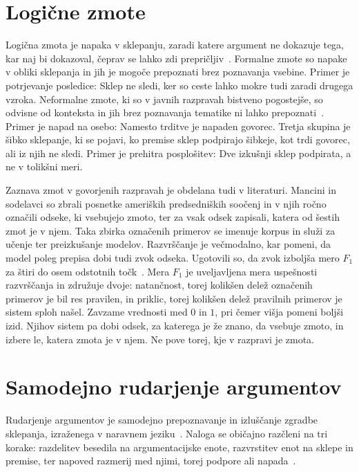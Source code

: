 \documentclass[a4paper, 12pt]{book}
\begin{document}
\section{Logične zmote}
\label{sec:zmote}
Logična zmota je napaka v sklepanju, zaradi katere argument ne dokazuje tega, kar naj bi dokazoval, čeprav se lahko zdi prepričljiv~\cite{copi2014}. Formalne zmote so napake v obliki sklepanja in jih je mogoče prepoznati brez poznavanja vsebine. Primer je potrjevanje posledice:  Sklep ne sledi, ker so ceste lahko mokre tudi zaradi drugega vzroka. Neformalne zmote, ki so v javnih razpravah bistveno pogostejše, so odvisne od konteksta in jih brez poznavanja tematike ni lahko prepoznati~\cite{walton2008}. Primer je napad na osebo:  Namesto trditve je napaden govorec. Tretja skupina je šibko sklepanje, ki se pojavi, ko premise sklep podpirajo šibkeje, kot trdi govorec, ali iz njih ne sledi. Primer je prehitra posplošitev:  Dve izkušnji sklep podpirata, a ne v tolikšni meri.

Zaznava zmot v govorjenih razpravah je obdelana tudi v literaturi. Mancini in sodelavci so zbrali posnetke ameriških predsedniških soočenj in v njih ročno označili odseke, ki vsebujejo zmoto, ter za vsak odsek zapisali, katera od šestih zmot je v njem. Taka zbirka označenih primerov se imenuje korpus in služi za učenje ter preizkušanje modelov. Razvrščanje je večmodalno, kar pomeni, da model poleg prepisa dobi tudi zvok odseka. Ugotovili so, da zvok izboljša mero $F_1$ za štiri do osem odstotnih točk~\cite{mancini2024fallacy}. Mera $F_1$ je uveljavljena mera uspešnosti razvrščanja in združuje dvoje: natančnost, torej kolikšen delež označenih primerov je bil res pravilen, in priklic, torej kolikšen delež pravilnih primerov je sistem sploh našel. Zavzame vrednosti med $0$ in $1$, pri čemer višja pomeni boljši izid. Njihov sistem pa dobi odsek, za katerega je že znano, da vsebuje zmoto, in izbere le, katera zmota je v njem. Ne pove torej, kje v razpravi je zmota.

\section{Samodejno rudarjenje argumentov}
\label{sec:argument-mining}

Rudarjenje argumentov je samodejno prepoznavanje in izluščanje zgradbe sklepanja, izraženega v naravnem jeziku~\cite{lawrence2019argument}. Naloga se običajno razčleni na tri korake: razdelitev besedila na argumentacijske enote, razvrstitev enot na sklepe in premise, ter napoved razmerij med njimi, torej podpore ali napada~\cite{stede2018}.
\end{document}
